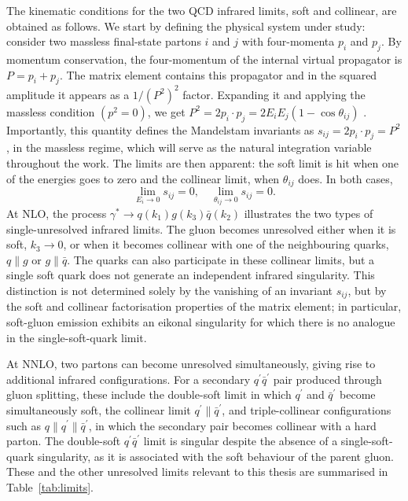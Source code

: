 The kinematic conditions for the two QCD infrared limits, soft and collinear, are obtained as follows. We 
start by defining the physical system under study: consider two massless final-state 
partons $i$ and $j$ with four-momenta $p_i$ and $p_j$. By momentum conservation, 
the four-momentum of the internal virtual propagator is $P=p_i+p_j$. The matrix 
element contains this propagator and in the squared amplitude it appears as a $1/(P^2)^2$ 
factor. Expanding it and applying the massless condition $(p^2=0)$, we get 
$P^2=2p_i\cdot p_j=2E_iE_j(1-\cos\theta_{ij})$ \cite{Ellis:1996mzs}. 
Importantly, this quantity defines 
the Mandelstam invariants as $s_{ij}=2p_i\cdot p_j=P^2$, in the massless regime, 
which will serve as the 
natural integration variable throughout the work.
The limits are then apparent: the soft limit is hit when one of the energies goes 
to zero and the collinear limit, when $\theta_{ij}$ does. In both cases,
\begin{equation}
    \lim_{E_i\to0}s_{ij}=0,\quad \lim_{\theta_{ij}\to 0}s_{ij}=0.
\end{equation}
At NLO, the process $\gamma^*\to q(k_1)g(k_3)\bar q(k_2)$ illustrates the two types
of single-unresolved infrared limits. The gluon becomes unresolved either when it is
soft, $k_3\to0$, or when it becomes collinear with one of the neighbouring quarks,
$q\parallel g$ or $g\parallel\bar q$. The quarks can also participate in these
collinear limits, but a single soft quark does not generate an independent
infrared singularity. This distinction is not determined solely by the vanishing of
an invariant $s_{ij}$, but by the soft and collinear factorisation properties of the
matrix element; in particular, soft-gluon emission exhibits an eikonal singularity
for which there is no analogue in the single-soft-quark limit.

At NNLO, two partons can become unresolved simultaneously, giving rise to
additional infrared configurations. For a secondary $q^\prime\bar q^\prime$ pair
produced through gluon splitting, these include the double-soft limit in which
$q^\prime$ and $\bar q^\prime$ become simultaneously soft, the collinear limit
$q^\prime\parallel\bar q^\prime$, and triple-collinear configurations such as
$q\parallel q^\prime\parallel\bar q^\prime$, in which the secondary pair becomes
collinear with a hard parton. The double-soft $q^\prime\bar q^\prime$ limit is
singular despite the absence of a single-soft-quark singularity, as it is
associated with the soft behaviour of the parent gluon. These and the other
unresolved limits relevant to this thesis are summarised in Table~\ref{tab:limits}.

